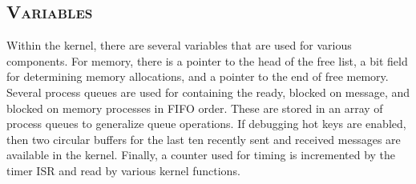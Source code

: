 \documentclass[oneside]{report}
\begin{document}
\begin{table}[H]
    \caption{Kernel Level Data Structures}
    \label{kernel_data_structs}
\end{table}


\subsection{\textsc{Variables}}
Within the kernel, there are several variables that are used for various
components. For memory, there is a pointer to the head of the free list, a bit
field for determining memory allocations, and a pointer to the end of free
memory. Several process queues are used for containing the ready, blocked on
message, and blocked on memory processes in FIFO order. These are stored in an
array of process queues to generalize queue operations. If debugging hot keys
are enabled, then two circular buffers for the last ten recently sent and
received messages are available in the kernel. Finally, a counter used for
timing is incremented by the timer ISR and read by various kernel functions.
\end{document}
